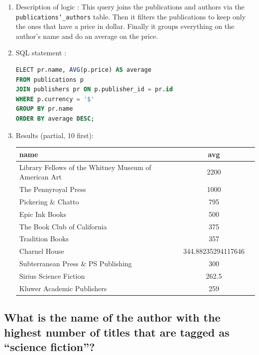 \documentclass[doubleside, titlepage]{article}
\begin{document}
	\begin{enumerate}
	\item Description of logic : This query joins the publications and authors via the \texttt{publications\char`_authors} table. Then it filters the publications to keep only the ones that have a price in dollar. Finally it groups everything on the author’s name and do an average on the price.
	\item SQL statement :
		\begin{lstlisting}[language=SQL,showspaces=false,basicstyle=\ttfamily,numberstyle=\tiny,commentstyle=\color{gray}]
ELECT pr.name, AVG(p.price) AS average
FROM publications p
JOIN publishers pr ON p.publisher_id = pr.id
WHERE p.currency = '$'
GROUP BY pr.name
ORDER BY average DESC;
		\end{lstlisting}

	\item Results (partial, 10 first):\\

	\begin{tabular}{|l|c|r|}
	  \hline
		  name & avg \\
	  \hline
		Library Fellows of the Whitney Museum of American Art & 2200\\
		The Pennyroyal Press & 1000\\
		Pickering \& Chatto & 795\\
		Epic Ink Books & 500\\
		The Book Club of California & 375\\
		Tradition Books & 357\\
		Charnel House & 344.88235294117646\\
		Subterranean Press \& PS Publishing & 300\\
		Sirius Science Fiction & 262.5\\
		Kluwer Academic Publishers & 259\\
	  \hline
\end{tabular}

\end{enumerate}

\subsection{What is the name of the author with the highest number of titles that are tagged as “science fiction”?}
\end{document}
